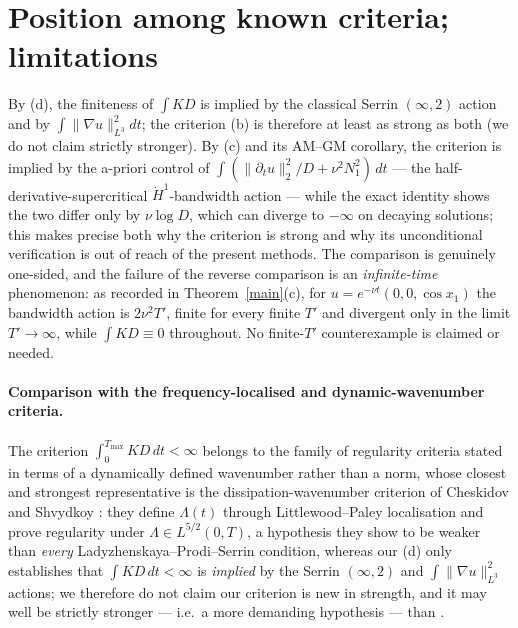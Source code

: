 \documentclass[11pt]{article}
\theoremstyle{definition}
\begin{document}
\section{Position among known criteria; limitations}\label{position}

By (d), the finiteness of $\int KD$ is implied by the classical Serrin
$(\infty,2)$ action and by $\int\|\nabla u\|_{L^3}^2dt$; the criterion
(b) is therefore at least as strong as both (we do not claim strictly
stronger). By (c) and its AM--GM corollary, the criterion is implied
by the a-priori control of
$\int(\|\partial_tu\|_2^2/D+\nu^2N_1^2)\,dt$ --- the
half-derivative-supercritical $\dot H^1$-bandwidth action --- while
the exact identity shows the two differ only by $\nu\log D$, which can
diverge to $-\infty$ on decaying solutions; this makes precise both
why the criterion is strong and why its unconditional verification is
out of reach of the present methods. The comparison is genuinely
one-sided, and the failure of the reverse comparison is an
\emph{infinite-time} phenomenon: as recorded in Theorem~\ref{main}(c),
for $u=e^{-\nu t}(0,0,\cos x_1)$ the bandwidth action is $2\nu^2T'$,
finite for every finite $T'$ and divergent only in the limit
$T'\to\infty$, while $\int KD\equiv0$ throughout. No finite-$T'$
counterexample is claimed or needed.

\paragraph{Comparison with the frequency-localised and dynamic-wavenumber
criteria.}
The criterion $\int_0^{T_{\max}}KD\,dt<\infty$ belongs to the family of
regularity criteria stated in terms of a dynamically defined
wavenumber rather than a norm, whose closest and strongest
representative is the dissipation-wavenumber criterion of Cheskidov and
Shvydkoy \cite{CheskidovShvydkoy2014}: they define $\Lambda(t)$ through
Littlewood--Paley localisation and prove regularity under
$\Lambda\in L^{5/2}(0,T)$, a hypothesis they show to be weaker than
\emph{every} Ladyzhenskaya--Prodi--Serrin condition, whereas our (d)
only establishes that $\int KD\,dt<\infty$ is \emph{implied} by the
Serrin $(\infty,2)$ and $\int\|\nabla u\|_{L^3}^2$ actions; we
therefore do not claim our criterion is new in strength, and it may
well be strictly stronger --- i.e.\ a more demanding hypothesis ---
than \cite{CheskidovShvydkoy2014}.
\end{document}
